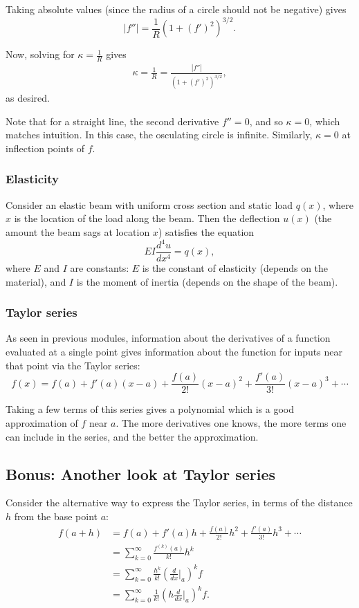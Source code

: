 \documentclass[twoside,openright,titlepage,a4paper]{book}
\begin{document}
\begin{sloppypar}
Taking absolute values (since the radius of a circle should not be negative) gives \[ |f''| = \frac{1}{R} \left(1+(f')^2 \right)^{3/2}. \]

Now, solving for $\kappa = \frac{1}{R}$ gives
\begin{align*}
\kappa = \frac{1}{R} = \frac{|f''|}{(1+(f')^2)^{3/2}},
\end{align*}
as desired.

Note that for a straight line, the second derivative $f''=0$, and so $\kappa = 0$, which matches intuition. In this case, the osculating circle is infinite. Similarly, $\kappa=0$ at inflection points of $f$.

\subsubsection{Elasticity}

Consider an elastic beam with uniform cross section and static load $q(x)$, where $x$ is the location of the load along the beam. Then the deflection $u(x)$ (the amount the beam sags at location $x$) satisfies the equation \[ EI \frac{d^4u}{dx^4} = q(x), \] where $E$ and $I$ are constants: $E$ is the constant of elasticity (depends on the material), and $I$ is the moment of inertia (depends on the shape of the beam).

\subsubsection{Taylor series}

As seen in previous modules, information about the derivatives of a function evaluated at a single point gives information about the function for inputs near that point via the Taylor series:
\[ f(x) = f(a) + f'(a)(x-a) + \frac{f(a)}{2!} (x-a)^2 + \frac{f'(a)}{3!}(x-a)^3 + \dotsb \]

Taking a few terms of this series gives a polynomial which is a good approximation of $f$ near $a$. The more derivatives one knows, the more terms one can include in the series, and the better the approximation.

\subsection{Bonus: Another look at Taylor series}

Consider the alternative way to express the Taylor series, in terms of the distance $h$ from the base point $a$:
\begin{align*}
f(a+h) &= f(a) + f'(a)h + \frac{f(a)}{2!}h^2 + \frac{f'(a)}{3!}h^3 + \dotsb \\
&= \sum_{k=0}^\infty \frac{f^{\left(k\right)}(a)}{k!}h^k \\
&= \sum_{k=0}^\infty \frac{h^k}{k!} \left(\frac{d}{dx} \bigg|_a \right)^k f \\
&= \sum_{k=0}^\infty \frac{1}{k!} \left(h \frac{d}{dx} \bigg|_a \right)^k f. 
\end{align*}


\end{sloppypar}
\end{document}
